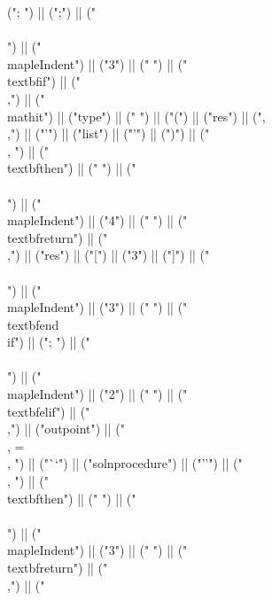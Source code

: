 \documentclass{article}
\begin{document}
\begin{center}
\begin{maplelatex}
{ ("; ") || (";") || ("\\\\\n") || ("\\mapleIndent{") || ("3") || ("} ") || ("\\textbf{if}") || (" \\,") || ("\\mathit{") || ("type") || ("} ") || ("(") || ("res") || (",\\,") || ("'") || ("list") || ("'") || (")") || (" \\, ") || ("\\textbf{then}") || (" ") || ("\\\\\n") || ("\\mapleIndent{") || ("4") || ("} ") || ("\\textbf{return}") || ("\\,") || ("res") || ("[") || ("3") || ("]") || ("\\\\\n") || ("\\mapleIndent{") || ("3") || ("} ") || ("\\textbf{end\\ if}") || ("; ") || ("\\\\\n") || ("\\mapleIndent{") || ("2") || ("} ") || ("\\textbf{elif}") || (" \\,") || ("outpoint") || (" \\, = \\, ") || ("``") || ("solnprocedure") || ("''") || (" \\, ") || ("\\textbf{then}") || (" ") || ("\\\\\n") || ("\\mapleIndent{") || ("3") || ("} ") || ("\\textbf{return}") || ("\\,") || ("}
\end{maplelatex}
\end{center}
\end{document}
